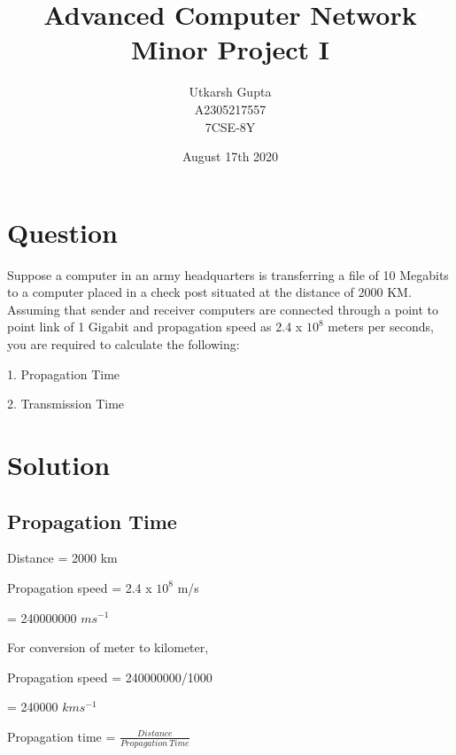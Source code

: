 \documentclass{article}
\title{\textbf{Advanced Computer Network \\
               Minor Project I}}
\author{\Large{Utkarsh Gupta \\
        \large A2305217557 \\
        \large 7CSE-8Y}}
\date{\Large{August 17th 2020}}
\begin{document}
\maketitle

\section{Question}

Suppose a computer in an army headquarters is transferring a file of 10 Megabits to a computer placed in a
check post situated at the distance of 2000 KM. Assuming that sender and receiver  computers are connected
through a point to point link of 1 Gigabit and propagation speed as 2.4 x $10^{8}$ meters per seconds, you are
required to calculate the following:

1.	Propagation Time

2.	Transmission Time 

\section{Solution}

\subsection{Propagation Time}

\vspace{2mm}
\hspace{5.5mm} Distance \hspace{1.95cm} = 2000 km

\hspace{0.3mm} Propagation speed \hspace{0.4cm} = 2.4 x $10^{8}$ m/s

\hspace{3.5cm} = 240000000 $ms^{-1}$

\vspace{5mm}
\hspace{0.3mm} For conversion of meter to kilometer,

\hspace{0.3mm} Propagation speed \hspace{0.4cm} = 240000000/1000

\hspace{3.5cm} = 240000 $kms^{-1}$

\vspace{5mm}
\hspace{0.3mm} Propagation time \hspace{0.4cm} = \Large{$\frac{Distance}{Propagation\ Time}$}
\vspace{2mm}
\end{document}

